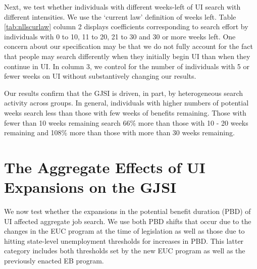 \documentclass[12pt]{article}
\begin{document}
\begin{spacing}{2}
Next, we test whether individuals with different weeks-left of UI search with different intensities. We use the `current law' definition of weeks left. Table \ref{tab:nllscurlaw} column 2 displays coefficients corresponding to search effort by individuals with 0 to 10, 11 to 20, 21 to 30 and 30 or more weeks left. One concern about our specification may be that we do not fully account for the fact that people may search differently when they initially begin UI than when they continue in UI. In column 3, we control for the number of individuals with 5 or fewer weeks on UI without substantively changing our results.

Our results confirm that the GJSI is driven, in part, by heterogeneous search activity across groups. In general, individuals with higher numbers of potential weeks search less than those with few weeks of benefits remaining. Those with fewer than 10 weeks remaining search 66\% more than those with 10 - 20 weeks remaining and 108\% more than those with more than 30 weeks remaining.\footnotemark \




\section{The Aggregate Effects of UI Expansions on the GJSI}
We now test whether the expansions in the potential benefit duration (PBD) of UI affected aggregate job search. We use both PBD shifts that occur due to the changes in the EUC program at the time of legislation as well as those due to hitting state-level unemployment thresholds for increases in PBD. This latter category includes both thresholds set by the new EUC program as well as the previously enacted EB program. 


\end{spacing}
\end{document}
